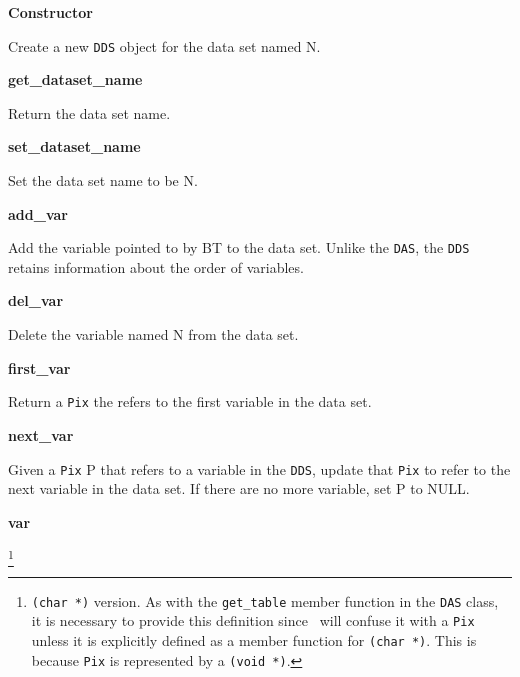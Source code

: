 \begin{description}

\item {\bf Constructor}


Create a new {\tt DDS} object for the data set named N.

\item {\bf get\_dataset\_name}


Return the data set name.

\item {\bf set\_dataset\_name}


Set the data set name to be N.

\item {\bf add\_var}


Add the variable pointed to by BT to the data set. Unlike the {\tt DAS}, the
{\tt DDS} retains information about the order of variables.

\item {\bf del\_var}


Delete the variable named N from the data set.

\item {\bf first\_var}


Return a {\tt Pix} the refers to the first variable in the data set.

\item {\bf next\_var}


Given a {\tt Pix} P that refers to a variable in the {\tt DDS}, update that
{\tt Pix} to refer to the next variable in the data set. If there are no more
variable, set P to NULL.

\item {\bf var}

 \footnote{{\tt (char *)}
version. As with the {\tt get\_table} member function in the {\tt DAS} class,
it is necessary to provide this definition since \Cpp\ will confuse it with a
{\tt Pix} unless it is explicitly defined as a member function for {\tt (char
*)}. This is because {\tt Pix} is represented by a {\tt (void *)}.}


\end{description}
